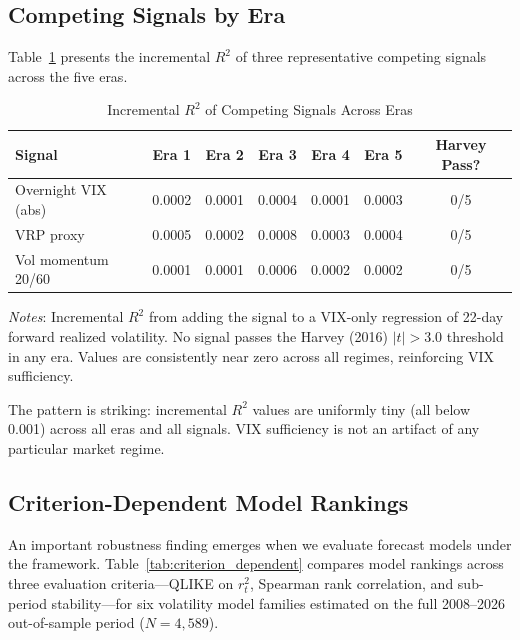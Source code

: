 \documentclass[12pt,a4paper]{article}
\begin{document}
\subsection{Competing Signals by Era}

Table~\ref{tab:competing_eras} presents the incremental $R^2$ of three representative competing signals across the five eras.

\begin{table}[H]
\centering
\small
\begin{threeparttable}
\caption{Incremental $R^2$ of Competing Signals Across Eras}
\label{tab:competing_eras}
\begin{tabular}{@{}lcccccc@{}}
\toprule
Signal & Era 1 & Era 2 & Era 3 & Era 4 & Era 5 & Harvey Pass? \\
\midrule
Overnight VIX (abs) & 0.0002 & 0.0001 & 0.0004 & 0.0001 & 0.0003 & 0/5 \\
VRP proxy & 0.0005 & 0.0002 & 0.0008 & 0.0003 & 0.0004 & 0/5 \\
Vol momentum 20/60 & 0.0001 & 0.0001 & 0.0006 & 0.0002 & 0.0002 & 0/5 \\
\bottomrule
\end{tabular}
\begin{tablenotes}
\small
\item \textit{Notes}: Incremental $R^2$ from adding the signal to a VIX-only regression of 22-day forward realized volatility. No signal passes the Harvey (2016) $|t|>3.0$ threshold in any era. Values are consistently near zero across all regimes, reinforcing VIX sufficiency.
\end{tablenotes}
\end{threeparttable}
\end{table}

The pattern is striking: incremental $R^2$ values are uniformly tiny (all below 0.001) across all eras and all signals. VIX sufficiency is not an artifact of any particular market regime.

\subsection{Criterion-Dependent Model Rankings}
\label{sec:criterion_dependent}

An important robustness finding emerges when we evaluate forecast models under the \citet{patton2011} framework. Table~\ref{tab:criterion_dependent} compares model rankings across three evaluation criteria---QLIKE on $r_t^2$, Spearman rank correlation, and sub-period stability---for six volatility model families estimated on the full 2008--2026 out-of-sample period ($N = 4{,}589$).
\end{document}
